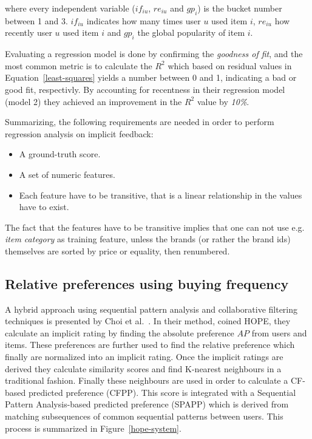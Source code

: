 where every independent variable ($if_{iu}$, $re_{iu}$ and $gp_{i}$) is the
bucket number between 1 and 3. $if_{iu}$ indicates how many times user $u$ used
item $i$, $re_{iu}$ how recently user $u$ used item $i$ and $gp_{i}$ the global
popularity of item $i$.

Evaluating a regression model is done by confirming the \textit{goodness of
fit}, and the most common metric is to calculate the $R^2$ which based on
residual values in Equation~\ref{least-squares} yields a number between 0 and
1, indicating a bad or good fit, respectivly. By accounting for recentness in
their regression model (model 2) they achieved an improvement in the $R^2$
value by \textit{10\%}.

Summarizing, the following requirements are needed in order to perform
regression analysis on implicit feedback:

\begin{itemize}
  \item A ground-truth score.
  \item A set of numeric features.
  \item Each feature have to be transitive, that is a linear relationship in
  the values have to exist.
\end{itemize}

The fact that the features have to be transitive implies that one can not use
e.g. \textit{item category} as training feature, unless the brands (or rather
the brand ids) themselves are sorted by price or equality, then renumbered.

\subsection{Relative preferences using buying frequency}

A hybrid approach using sequential pattern analysis and collaborative filtering
techniques is presented by Choi et al.~\cite{choi2012hybrid}. In their
method, coined HOPE, they calculate an implicit rating by finding the
absolute preference $AP$ from users and items. These preferences are further
used to find the relative preference which finally are normalized into an
implicit rating. Once the implicit ratings are derived they calculate
similarity scores and find K-nearest neighbours in a traditional fashion.
Finally these neighbours are used in order to calculate a CF-based predicted
preference (CFPP). This score is integrated with a Sequential Pattern
Analysis-based predicted preference (SPAPP) which is derived from matching
subsequences of common sequential patterns between users. This process is
summarized in Figure~\ref{hope-system}.

